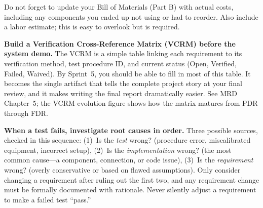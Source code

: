 \begin{warnbox}
Do not forget to update your Bill of Materials (Part B) with actual costs, including any components you ended up not using or had to reorder. Also include a labor estimate; this is easy to overlook but is required.
\end{warnbox}

\begin{protip}
\textbf{Build a Verification Cross-Reference Matrix (VCRM) before the system demo.} The VCRM is a simple table linking each requirement to its verification method, test procedure ID, and current status (Open, Verified, Failed, Waived). By Sprint~5, you should be able to fill in most of this table. It becomes the single artifact that tells the complete project story at your final review, and it makes writing the final report dramatically easier. See MRD Chapter~5; the VCRM evolution figure shows how the matrix matures from PDR through FDR.
\end{protip}

\begin{tipbox}
\textbf{When a test fails, investigate root causes in order.} Three possible sources, checked in this sequence: (1)~Is the \textit{test} wrong? (procedure error, miscalibrated equipment, incorrect setup), (2)~Is the \textit{implementation} wrong? (the most common cause---a component, connection, or code issue), (3)~Is the \textit{requirement} wrong? (overly conservative or based on flawed assumptions). Only consider changing a requirement after ruling out the first two, and any requirement change must be formally documented with rationale. Never silently adjust a requirement to make a failed test ``pass.''
\end{tipbox}

